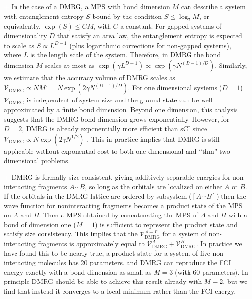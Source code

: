 \documentclass[aip,jcp,amsmath,amssymb, preprint]{revtex4-1}
\newcommand{\add}[1]{\colorbox{goodgreen}{\textcolor{white}{\footnotesize  \fontfamily{phv}\selectfont +}}
    \textcolor{goodgreen}{{#1}}\xspace}
\begin{document}
\add{In the case of a DMRG, a MPS with bond dimension $M$ can describe a system with entanglement entropy $S$ bound by the condition $S \leq \log_2 M$,\cite{Evenbly2011TensorNetwork} or equivalently, $\exp(S) \leq C M$, with $C$ a constant.
For gapped systems of dimensionality $D$ that satisfy an area law, the entanglement entropy is expected to scale as $S \propto L^{D-1}$ (plus  logarithmic corrections for non-gapped systems), where $L$ is the length scale of the system.\cite{hastings2004lieb}
Therefore, in DMRG the bond dimension $M$ scales at most as $\exp(\gamma L^{D-1}) \propto \exp(\gamma N^{(D-1)/D})$.
Similarly, we estimate that the accuracy volume of DMRG scales as $\mathcal{V}_{\text{DMRG}} \propto N M^2 =  N \exp(2 \gamma N^{(D-1)/D})$.
For one dimensional systems ($D = 1$) $\mathcal{V}_{\text{DMRG}}$ is independent of system size and the ground state can be well approximated by a finite bond dimension.
Beyond one dimension, this analysis suggests that the DMRG bond dimension grows exponentially.
However, for $D = 2$, DMRG is already exponentially more efficient than sCI since  $\mathcal{V}_{\text{DMRG}}\propto N \exp(2 \gamma N^{1/2})$ .
This in practice implies that DMRG is still applicable without exponential cost to both one-dimensional and ``thin'' two-dimensional problems.\cite{stoudenmire2012studying}}

\add{
DMRG is formally size consistent, giving additively separable energies for non-interacting fragments $A\cdots B$, so long as the orbitals are localized on either $A$ or $B$.\cite{chan2011density, Wouters2014TheDensity} 
If the orbitals in the DMRG lattice are ordered by subsystem ($[A\cdots B]$) then the wave function for noninteracting fragments becomes a product state of the MPS on $A$ and $B$.
Then a MPS obtained by concatenating the MPS of $A$ and $B$ with a bond of dimension one ($M=1$) is sufficient to represent the product state and satisfy size consistency.
This implies that the $\mathcal{V}^{A+B}_{\text{DMRG}}$ for a system of non-interacting fragments is approximately equal to $\mathcal{V}^{A}_{\text{DMRG}} + \mathcal{V}^{B}_{\text{DMRG}}$. In practice we have found this to be nearly true, a product state for a system of five non-interacting \ce{H2} molecules has 20 parameters, and DMRG can reproduce the FCI energy exactly with a bond dimension as small as $M=3$ (with 60 parameters). 
In principle DMRG should be able to achieve this result already with $M=2$, but we find that instead it converges to a local minimum rather than the FCI energy.}
\end{document}
